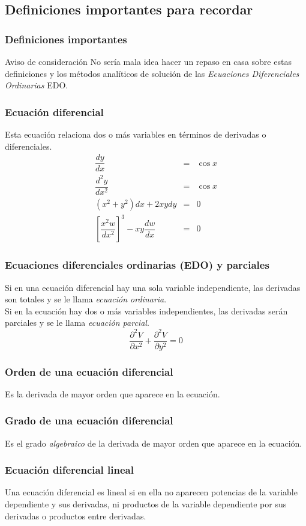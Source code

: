 \subsection{Definiciones importantes para recordar}
\begin{frame}
\frametitle{Definiciones importantes}
\begin{block}{Aviso de consideración}
	No sería mala idea hacer un repaso en casa sobre estas definiciones y los métodos analíticos de solución de las	 \textit{Ecuaciones Diferenciales Ordinarias} EDO.
\end{block}
\end{frame}
\begin{frame}
\frametitle{Ecuación diferencial}
Esta ecuación relaciona dos o más variables en términos de derivadas o diferenciales.
\\
\fontsize{12}{12}\selectfont
\begin{eqnarray*}
	\dfrac{dy}{dx} & = & \cos x \\
	\dfrac{d^{2} y}{dx^{2}} & = &  \cos x \\
	( x^{2} + y^{2} ) dx + 2 xy dy & = & 0 \\
	\left[ \dfrac{x^{2} w}{dx^{2}} \right]^{3} - xy \dfrac{dw}{dx} & = & 0 
\end{eqnarray*}
\end{frame}
\begin{frame}
\frametitle{Ecuaciones diferenciales ordinarias (EDO) y parciales}
Si en una ecuación diferencial hay una sola variable independiente, las derivadas son totales y se le llama \textit{ecuación ordinaria}.
\\
\medskip
Si en la ecuación hay dos o más variables independientes, las derivadas serán parciales y se le llama \textit{ecuación parcial}.
\[ \dfrac{\partial^{2} V}{\partial x^{2}} + \dfrac{\partial^{2} V}{\partial y^{2}} = 0\]
\end{frame}
\begin{frame}
\frametitle{Orden de una ecuación diferencial}
Es la derivada de mayor orden que aparece en la ecuación.
\end{frame}
\begin{frame}
\frametitle{Grado de una ecuación diferencial}
Es el grado \textit{algebraico} de la derivada de mayor orden que aparece en la ecuación.
\end{frame}
\begin{frame}
\frametitle{Ecuación diferencial lineal}
Una ecuación diferencial es lineal si en ella no aparecen potencias de la variable dependiente y sus derivadas, ni productos de la variable dependiente por sus derivadas o productos entre derivadas.
\end{frame}
